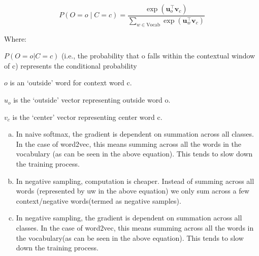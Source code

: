 \begin{enumerate}[1.]
\begin{equation*}P(O=o \mid C=c) = \frac{\exp(\bm u_{o}^\top \bm v_c)}{\sum_{w \in \text{Vocab}} \exp(\bm u_{w}^\top \bm v_c)}\end{equation*}

Where:

$P(O = o \vert C = c)$ (i.e., the probability that o falls within the contextual window of c) represents the conditional probability

$o$ is an `outside' word for context word c.

$u_o$ is the `outside' vector representing outside word o.

$v_c$ is the `center' vector representing center word c. 

\begin{enumerate}[(a)]
\item In naive softmax, the gradient is dependent on summation across all classes. In the case of word2vec, this means summing across all the words in the vocabulary (as can be seen in the above equation). This tends to slow down the training process.
\item In negative sampling, computation is cheaper. Instead of summing across all words (represented by uw in the above equation) we only sum across a few context/negative words(termed as negative samples).
\item In negative sampling, the gradient is dependent on summation across all classes. In the case of word2vec, this means summing across all the words in the vocabulary(as can be seen in the above equation). This tends to slow down the training process.
\end{enumerate}


\end{enumerate}
